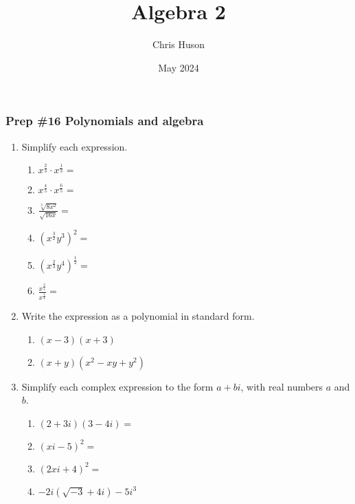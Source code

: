 \documentclass[12pt, twoside]{article}
\title{Algebra 2}
\author{Chris Huson}
\date{May 2024}
\begin{document}
\subsubsection*{Prep \#16 Polynomials and algebra}
\begin{enumerate}[itemsep=0.5cm]

\item Simplify each expression.
    \begin{multicols}{2}
    \begin{enumerate}[itemsep=0.75cm]
        \item $\displaystyle x^{\frac{2}{3}} \cdot x^{\frac{1}{3}} =$
        \item $\displaystyle x^{\frac{4}{5}} \cdot x^{\frac{6}{5}} =$
        \item $\displaystyle \frac{\sqrt[3]{8x^2}}{\sqrt{16x}} = $
        \item $\displaystyle (x^{\frac{3}{2}}y^3)^2 =$
        \item $\displaystyle (x^{\frac{2}{3}}y^4)^{\frac{1}{2}} =$
        \item $\displaystyle \frac{x^{\frac{3}{4}}}{x^{\frac{1}{4}}} =$
    \end{enumerate}
    \end{multicols} \vspace{0.5cm}

\item Write the expression as a polynomial in standard form.
    \begin{multicols}{2}
    \begin{enumerate}
        \item $(x-3)(x+3)$
        \item $(x+y)(x^2-xy+y^2)$
    \end{enumerate}
    \end{multicols} \vspace{3cm}

\item Simplify each complex expression to the form $a+bi$, with real numbers $a$ and $b$.
    \begin{multicols}{2}
    \begin{enumerate}[itemsep=4cm]
        \item $(2+3i)(3-4i)=$
        \item $(xi-5)^2=$
        \item $(2xi+4)^2=$
        \item $-2i(\sqrt{-3}+4i)-5i^3$
    \end{enumerate}
    \end{multicols} \vspace{3cm}


\end{enumerate}
\end{document}
